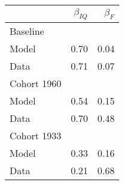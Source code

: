 \begin{tabular}{lrr}
\hline
  & $\beta_{IQ}$  & $\beta_{F}$  \\ 
\hline
Baseline &   &   \\ 
Model & 0.70  & 0.04  \\ 
Data & 0.71  & 0.07  \\ 
Cohort 1960 &   &   \\ 
Model & 0.54  & 0.15  \\ 
Data & 0.70  & 0.48  \\ 
Cohort 1933 &   &   \\ 
Model & 0.33  & 0.16  \\ 
Data & 0.21  & 0.68  \\ 
\hline
\end{tabular}%

